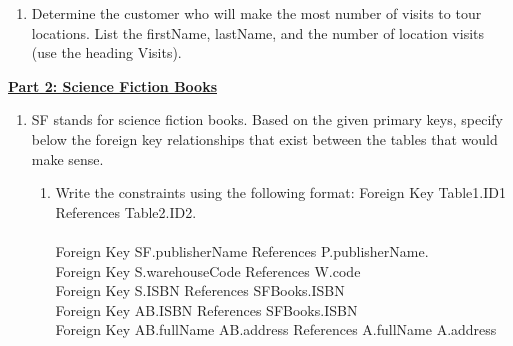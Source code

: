 \documentclass[12pt]{article}
\begin{document}
\begin{enumerate}
  \item Determine the customer who will make the most number of visits to tour locations. List the firstName, lastName, and the number of location visits (use the heading Visits).
    \begin{tcolorbox}
      \begin{center}
      \end{center}
    \end{tcolorbox}
      
\end{enumerate}

\textbf{\underline{Part 2: Science Fiction Books}}
\begin{enumerate} 
\item SF stands for science fiction books. Based on the given primary keys, specify below the foreign key relationships that exist between the tables that would make sense. 
  \begin{enumerate}
  \item Write the constraints using the following format: Foreign Key Table1.ID1 References Table2.ID2. \\ \\
    Foreign Key SF.publisherName References P.publisherName. \\
    Foreign Key S.warehouseCode References W.code \\
    Foreign Key S.ISBN References SFBooks.ISBN \\
    Foreign Key AB.ISBN References SFBooks.ISBN \\
    Foreign Key AB.fullName AB.address References A.fullName A.address  \\
    

\end{enumerate}
\end{enumerate}
\end{document}
